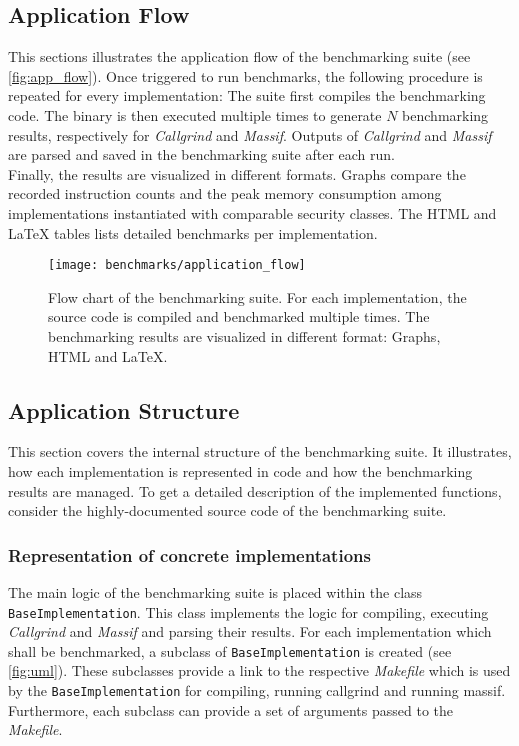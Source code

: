 \subsection{Application Flow}\label{sec:app_flow}
This sections illustrates the application flow of the benchmarking suite (see \autoref{fig:app_flow}). Once triggered to run benchmarks, the following procedure is repeated for every implementation: The suite first compiles the benchmarking code. The binary is then executed multiple times to generate $N$ benchmarking results, respectively for \textit{Callgrind} and \textit{Massif}. Outputs of \textit{Callgrind} and \textit{Massif} are parsed and saved in the benchmarking suite after each run.
\\
Finally, the results are visualized in different formats. Graphs compare the recorded instruction counts and the peak memory consumption among implementations instantiated with comparable security classes. The \gls{HTML} and LaTeX tables lists detailed benchmarks per implementation.

\begin{figure}[H]
  \centering
  \texttt{[image: benchmarks/application\_flow]}
  \caption[Flow chart of the benchmarking suite.]
  {Flow chart of the benchmarking suite. For each implementation, the source code is compiled and benchmarked multiple times. The benchmarking results are visualized in different format: Graphs, \gls{HTML} and LaTeX.
  } \label{fig:app_flow}
\end{figure}




\subsection{Application Structure}\label{sec:app_structure}

This section covers the internal structure of the benchmarking suite. It illustrates, how each implementation is represented in code and how the benchmarking results are managed. To get a detailed description of the implemented functions, consider the highly-documented source code of the benchmarking suite.

\subsubsection{Representation of concrete implementations}

The main logic of the benchmarking suite is placed within the class \texttt{BaseImplementation}. This class implements the logic for compiling, executing \textit{Callgrind} and \textit{Massif} and parsing their results. For each implementation which shall be benchmarked, a subclass of \texttt{BaseImplementation} is created (see \autoref{fig:uml}). These subclasses provide a link to the respective \textit{Makefile} which is used by the \texttt{BaseImplementation} for compiling, running callgrind and running massif. Furthermore, each subclass can provide a set of arguments passed to the \textit{Makefile}.

